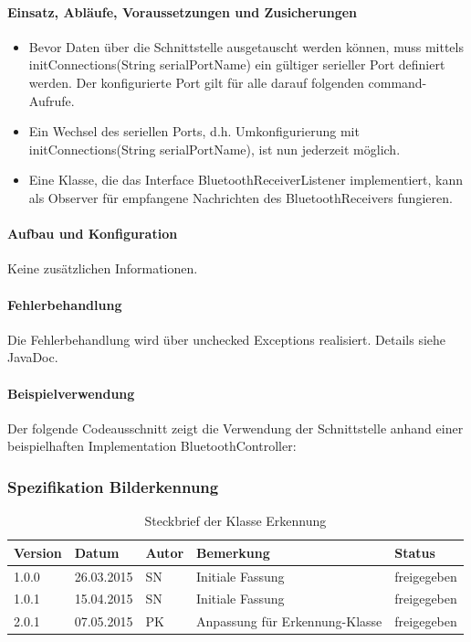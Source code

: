 \paragraph{Einsatz, Abläufe, Voraussetzungen und Zusicherungen}
\begin{itemize}
	\item{Bevor Daten über die Schnittstelle ausgetauscht werden können, muss mittels initConnections(String serialPortName) ein gültiger serieller Port definiert werden. Der konfigurierte Port gilt für alle darauf folgenden command-Aufrufe. }
	\item{Ein Wechsel des seriellen Ports, d.h. Umkonfigurierung mit initConnections(String serialPortName), ist nun jederzeit möglich.}
	\item{Eine Klasse, die das Interface BluetoothReceiverListener implementiert, kann als Observer für empfangene Nachrichten des BluetoothReceivers fungieren.}
\end{itemize}
\paragraph{Aufbau und Konfiguration} 
Keine zusätzlichen Informationen. \\
\paragraph{Fehlerbehandlung}
Die Fehlerbehandlung wird über unchecked Exceptions realisiert. Details siehe JavaDoc. \\
\paragraph{Beispielverwendung}
Der folgende Codeausschnitt zeigt die Verwendung der Schnittstelle anhand einer beispielhaften Implementation BluetoothController: \\


\subsubsection{Spezifikation Bilderkennung}


\begin{table}[h!]
	\begin{tabular}{|l|l|l|l|l|}
		\hline 
		Version & Datum & Autor & Bemerkung & Status \\ 
		\hline 
		1.0.0 & 26.03.2015 & SN & Initiale Fassung & freigegeben \\ 
		\hline 
		1.0.1 & 15.04.2015 & SN & Initiale Fassung & freigegeben \\ 
		\hline 
		2.0.1 & 07.05.2015 & PK & Anpassung für Erkennung-Klasse & freigegeben \\ 
		\hline 
	\end{tabular} 
	\caption{Steckbrief der Klasse Erkennung}
\end{table}

